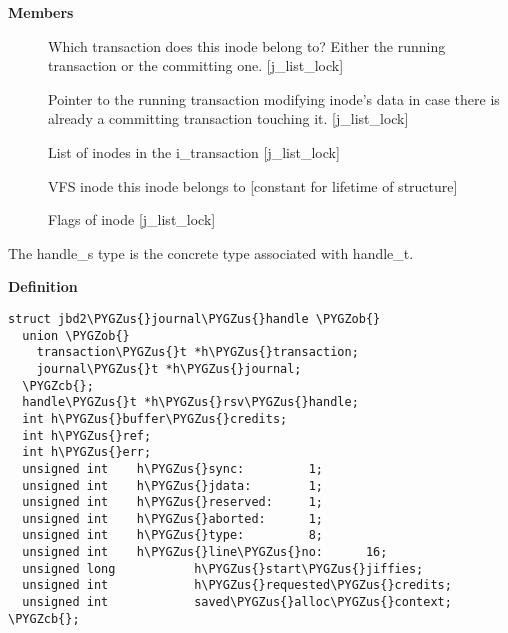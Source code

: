 \documentclass[a4paper,8pt,english]{sphinxmanual}
\def\PYGZus{\char`\_}
\def\PYGZob{\char`\{}
\def\PYGZcb{\char`\}}
\begin{document}
\textbf{Members}
\begin{description}
\item[{}] \leavevmode
Which transaction does this inode belong to? Either the running
transaction or the committing one. {[}j\_list\_lock{]}

\item[{}] \leavevmode
Pointer to the running transaction modifying inode's data in case
there is already a committing transaction touching it. {[}j\_list\_lock{]}

\item[{}] \leavevmode
List of inodes in the i\_transaction {[}j\_list\_lock{]}

\item[{}] \leavevmode
VFS inode this inode belongs to {[}constant for lifetime of structure{]}

\item[{}] \leavevmode
Flags of inode {[}j\_list\_lock{]}

\end{description}

\begin{fulllineitems}
\label{filesystems/index:c.jbd2_journal_handle}
The handle\_s type is the concrete type associated with handle\_t.

\end{fulllineitems}


\textbf{Definition}

\begin{Verbatim}[commandchars=\\\{\}]
struct jbd2\PYGZus{}journal\PYGZus{}handle \PYGZob{}
  union \PYGZob{}
    transaction\PYGZus{}t *h\PYGZus{}transaction;
    journal\PYGZus{}t *h\PYGZus{}journal;
  \PYGZcb{};
  handle\PYGZus{}t *h\PYGZus{}rsv\PYGZus{}handle;
  int h\PYGZus{}buffer\PYGZus{}credits;
  int h\PYGZus{}ref;
  int h\PYGZus{}err;
  unsigned int    h\PYGZus{}sync:         1;
  unsigned int    h\PYGZus{}jdata:        1;
  unsigned int    h\PYGZus{}reserved:     1;
  unsigned int    h\PYGZus{}aborted:      1;
  unsigned int    h\PYGZus{}type:         8;
  unsigned int    h\PYGZus{}line\PYGZus{}no:      16;
  unsigned long           h\PYGZus{}start\PYGZus{}jiffies;
  unsigned int            h\PYGZus{}requested\PYGZus{}credits;
  unsigned int            saved\PYGZus{}alloc\PYGZus{}context;
\PYGZcb{};
\end{Verbatim}
\end{document}
